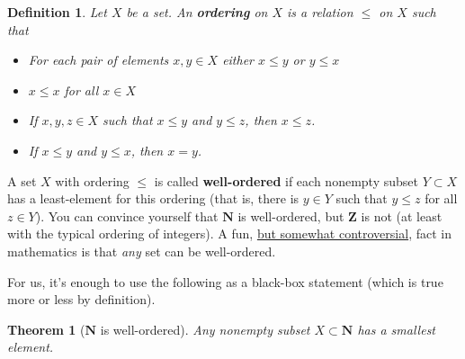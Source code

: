 \documentclass[12pt]{article}
\numberwithin{equation}{subsection}
\newtheorem{thm}[subsection]{Theorem}
\newtheorem{defn}[subsection]{Definition}
\theoremstyle{note}
\begin{document}
\begin{defn}Let $X$ be a set. An \textbf{ordering} on $X$ is a relation $\leq$ on $X$ such that~\begin{itemize}
\item For each pair of elements $x,y\in X$ either $x\leq y$ or $y\leq x$
\item $x\leq x$ for all $x\in X$
\item If $x,y,z\in X$ such that $x\leq y$ and $y\leq z$, then $x\leq z$.
\item If $x\leq y$ and $y\leq x$, then $x=y$. 
\end{itemize}
\end{defn}
 
A set $X$ with ordering $\leq$ is called \textbf{well-ordered} if each nonempty subset $Y\subset X$ has a least-element for this ordering (that is, there is $y\in Y$ such that $y\leq z$ for all $z\in Y$). You can convince yourself that $\mathbf{N}$ is well-ordered, but $\mathbf{Z}$ is not (at least with the typical ordering of integers). A fun, \href{https://en.wikipedia.org/wiki/Constructivism_(philosophy_of_mathematics)}{but somewhat controversial}, fact in mathematics is that \textit{any} set can be well-ordered. 

For us, it's enough to use the following as a black-box statement (which is true more or less by definition). 

\begin{thm}[$\mathbf{N}$ is well-ordered]\label{well-ord}
	Any nonempty subset $X\subset \mathbf{N}$ has a smallest element. 

\end{thm}
\end{document}
